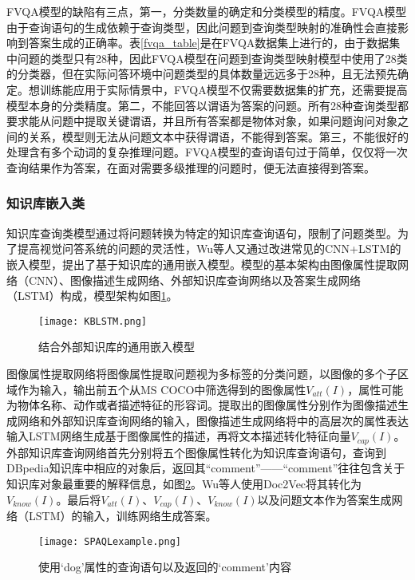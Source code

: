FVQA模型的缺陷有三点，第一，分类数量的确定和分类模型的精度。FVQA模型由于查询语句的生成依赖于查询类型，因此问题到查询类型映射的准确性会直接影响到答案生成的正确率。表\ref{fvqa_table}是在FVQA数据集上进行的，由于数据集中问题的类型只有28种，因此FVQA模型在问题到查询类型映射模型中使用了28类的分类器，但在实际问答环境中问题类型的具体数量远远多于28种，且无法预先确定。想训练能应用于实际情景中，FVQA模型不仅需要数据集的扩充，还需要提高模型本身的分类精度。第二，不能回答以谓语为答案的问题。所有28种查询类型都要求能从问题中提取关键谓语，并且所有答案都是物体对象，如果问题询问对象之间的关系，模型则无法从问题文本中获得谓语，不能得到答案。第三，不能很好的处理含有多个动词的复杂推理问题。FVQA模型的查询语句过于简单，仅仅将一次查询结果作为答案，在面对需要多级推理的问题时，便无法直接得到答案。

\subsubsection{知识库嵌入类}

知识库查询类模型通过将问题转换为特定的知识库查询语句，限制了问题类型。为了提高视觉问答系统的问题的灵活性，Wu等人又通过改进常见的CNN+LSTM的嵌入模型，提出了基于知识库的通用嵌入模型。模型的基本架构由图像属性提取网络（CNN）、图像描述生成网络、外部知识库查询网络以及答案生成网络（LSTM）构成，模型架构如图\ref{KBLSTM}。
\begin{figure}[H]
	\centering
	\texttt{[image: KBLSTM.png]}
	\caption{结合外部知识库的通用嵌入模型}
	\label{KBLSTM}
\end{figure}

图像属性提取网络将图像属性提取问题视为多标签的分类问题，以图像的多个子区域作为输入，输出前五个从MS COCO中筛选得到的图像属性$V_{att}(I)$，属性可能为物体名称、动作或者描述特征的形容词。提取出的图像属性分别作为图像描述生成网络和外部知识库查询网络的输入，图像描述生成网络将\cite{wu2016value}中的高层次的属性表达输入LSTM网络生成基于图像属性的描述，再将文本描述转化特征向量$V_{cap}(I)$。外部知识库查询网络首先分别将五个图像属性转化为知识库查询语句，查询到DBpedia知识库中相应的对象后，返回其“comment”——“comment”往往包含关于知识库对象最重要的解释信息，如图\ref{SPAQLexample}。Wu等人使用Doc2Vec将其转化为$V_{know}(I)$。最后将$V_{att}(I)$、$V_{cap}(I)$、$V_{know}(I)$以及问题文本作为答案生成网络（LSTM）的输入，训练网络生成答案。
\begin{figure}[H]
	\centering
	\texttt{[image: SPAQLexample.png]}
	\caption{使用‘dog’属性的查询语句以及返回的‘comment’内容}
	\label{SPAQLexample}
\end{figure}

